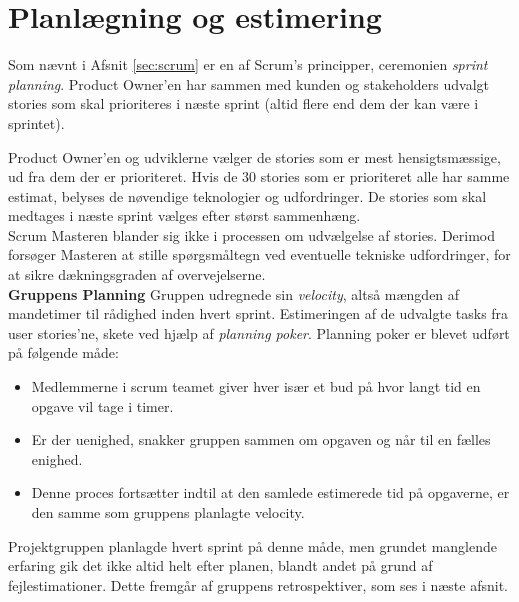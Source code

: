\section{Planlægning og estimering}\label{sec:planning}
Som nævnt i Afsnit \ref{sec:scrum} er en af Scrum's principper, ceremonien \textit{sprint planning}.
Product Owner’en har sammen med kunden og stakeholders udvalgt stories som skal prioriteres i næste sprint (altid flere end dem der kan være i sprintet). 

Product Owner’en og udviklerne vælger de stories som er mest hensigtsmæssige, ud fra dem der er prioriteret.
Hvis de 30 stories som er prioriteret alle har samme estimat, belyses de nøvendige teknologier og udfordringer. 
De stories som skal medtages i næste sprint vælges efter størst sammenhæng.\\

Scrum Masteren blander sig ikke i processen om udvælgelse af stories. Derimod forsøger Masteren at stille spørgsmåltegn ved eventuelle tekniske 
udfordringer, for at sikre dækningsgraden af overvejelserne.\\

\textbf{Gruppens Planning}
Gruppen udregnede sin \textit{velocity}, altså mængden af mandetimer til rådighed inden hvert sprint.
Estimeringen af de udvalgte tasks fra user stories'ne, skete ved hjælp af \textit{planning poker}. Planning poker er blevet udført på følgende måde:

\begin{itemize}
    \item Medlemmerne i scrum teamet giver hver især et bud på hvor langt tid en opgave vil tage i timer.
    \item Er der uenighed, snakker gruppen sammen om opgaven og når til en fælles enighed.
    \item Denne proces fortsætter indtil at den samlede estimerede tid på opgaverne, er den samme som gruppens planlagte velocity.
\end{itemize}

Projektgruppen planlagde hvert sprint på denne måde, men grundet manglende erfaring gik det ikke altid helt efter planen, blandt andet på grund
af fejlestimationer. Dette fremgår af gruppens retrospektiver, som ses i næste afsnit.